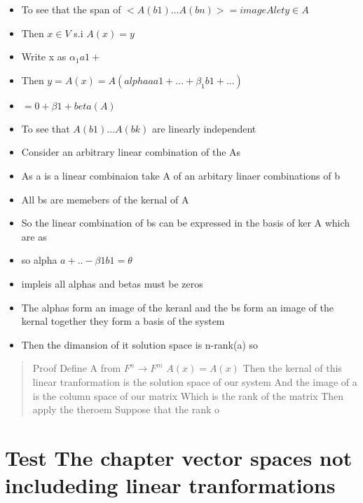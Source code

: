 \documentclass[twocolumn]{article}
\begin{document}
\begin{itemize}
\item
  To see that the span of \(<A(b1) \dots A(bn)> = image A let y \in A\)
\item
  Then \(x \in V\) s.i \(A(x)=y\)
\item
  Write x as \(\alpha_1 a1 +\)
\item
  Then \(y = A(x) =A(alpha a a1 + ... + \beta_1 b1 +...)\)
\item
  \(= 0 + \beta1 + beta(A)\)
\item
  To see that \(A(b1) ... A(bk)\) are linearly independent
\item
  Consider an arbitrary linear combination of the As
\item
  As a is a linear combinaion take A of an arbitary linaer combinations
  of b
\item
  All bs are memebers of the kernal of A
\item
  So the linear combination of bs can be expressed in the basis of ker A
  which are as
\item
  so alpha \(a + .. - \beta 1 b1 = \theta\)
\item
  impleis all alphas and betas must be zeros
\item
  The alphas form an image of the keranl and the bs form an image of the
  kernal together they form a basis of the system
\item
  Then the dimansion of it solution space is n-rank(a) so
\end{itemize}

\begin{quote}
Proof Define A from \(F^n \to F^m\) \(A(x) = A(x)\) Then the kernal of
this linear tranformation is the solution space of our system And the
image of a is the column space of our matrix Which is the rank of the
matrix Then apply the theroem Suppose that the rank o
\end{quote}

\hypertarget{test-the-chapter-vector-spaces-not-includeding-linear-tranformations}{%
\section{Test The chapter vector spaces not includeding linear
tranformations}\label{test-the-chapter-vector-spaces-not-includeding-linear-tranformations}}
\end{document}
